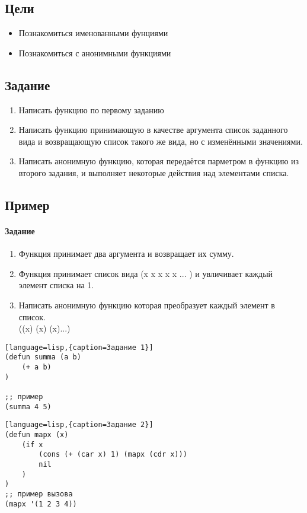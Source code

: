 \documentclass[a4paper,12pt]{article}
\begin{document}
\subsection{Цели}
\begin{itemize}
	\item Познакомиться именованными фунциями
	\item Познакомиться с анонимными функциями
\end{itemize}

\subsection{Задание}
\begin{enumerate}
	\item Написать функцию по первому заданию
	\item Написать функцию принимающую в качестве аргумента список заданного вида и возвращающую список такого же вида, но с изменёнными значениями.
	\item Написать анонимную функцию, которая передаётся парметром в функцию из второго задания, и выполняет некоторые действия над элементами списка.
\end{enumerate}

\subsection{Пример}
\paragraph{Задание}
\begin{enumerate}
	\item Функция принимает два аргумента и возвращает их сумму.
	\item Функция принимает список вида (x x x x x ... ) и увличивает каждый элемент списка на 1.
	\item Написать анонимную функцию которая преобразует каждый элемент в список.\\ ((x) (x) (x)...)
\end{enumerate}

\begin{lstlisting}[language=lisp,{caption=Задание 1}]
(defun summa (a b) 
	(+ a b)
)

;; пример 
(summa 4 5)
\end{lstlisting}

\begin{lstlisting}[language=lisp,{caption=Задание 2}]
(defun mapx (x) 
	(if x
		(cons (+ (car x) 1) (mapx (cdr x)))
		nil
	)
)
;; пример вызова
(mapx '(1 2 3 4))
\end{lstlisting}
\end{document}
